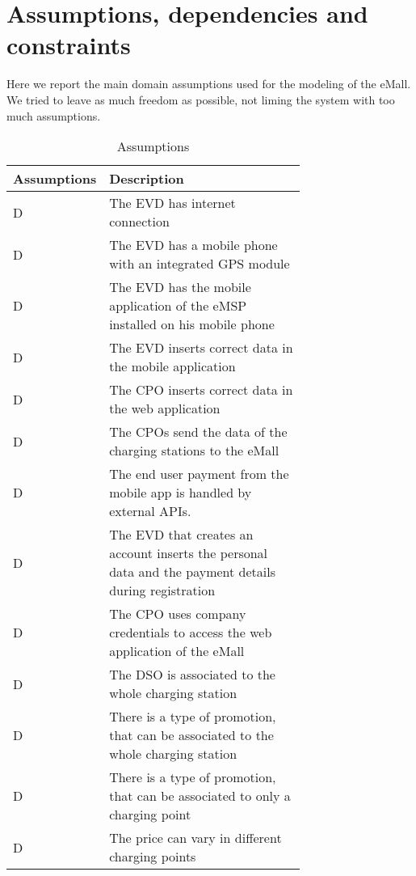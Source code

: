 \section{Assumptions, dependencies and constraints}
\label{sec:Assumptions, dependencies and constraints}%
Here we report the main domain assumptions used for the modeling of the eMall. We tried to leave as much freedom as possible, not liming the system with too much assumptions.
\setcounter{ac}{1}
\newcommand{\acount}{\theac\stepcounter{ac}}
\begin{table}[h!]
    \centering
    \begin{tabular}{|l|p{0.725\linewidth}|}
     \hline
     \textbf{Assumptions} & \textbf{Description} \\
     \hline
     D\acount & The EVD has internet connection \\
     \hline
     D\acount & The EVD has a mobile phone with an integrated GPS module \\
     \hline
     D\acount & The EVD has the mobile application of the eMSP installed on his mobile phone \\
     \hline
     D\acount & The EVD inserts correct data in the mobile application \\
     \hline
     D\acount & The CPO inserts correct data in the web application \\
     \hline
     D\acount & The CPOs send the data of the charging stations to the eMall \\
     \hline
     D\acount & The end user payment from the mobile app is handled by external APIs.\\
     \hline
     D\acount & The EVD that creates an account inserts the personal data and the payment details during registration \\
     \hline
     D\acount & The CPO uses company credentials to access the web application of the eMall \\
     \hline
     D\acount & The DSO is associated to the whole charging station \\
     \hline
     D\acount & There is a type of promotion, that can be associated to the whole charging station \\
     \hline
     D\acount & There is a type of promotion, that can be associated to only a charging point \\
     \hline
     D\acount & The price can vary in different charging points \\
     \hline
\end{tabular}
    \caption{Assumptions}
    \label{tab:Assumptions}
\end{table}